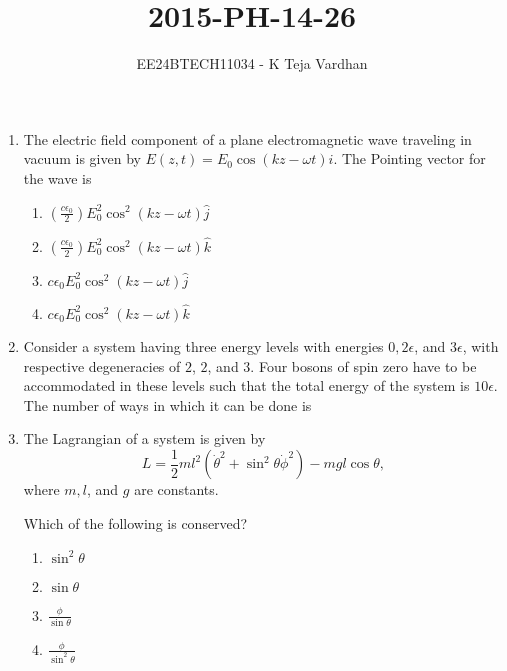 \documentclass{article}
\newcommand{\brak}[1]{\left( #1 \right)}
\begin{document}

\title{2015-PH-14-26}
\author{EE24BTECH11034 - K Teja Vardhan}
{\let\newpage\relax\maketitle}

\begin{enumerate}

 \item The electric field component of a plane electromagnetic wave traveling in vacuum is given by $E\brak{z,t} = E_0 \cos\brak{kz - \omega t}\hat{i}$. The Pointing vector for the wave is

        \begin{enumerate}
            \item $\brak{\frac{c \epsilon_0}{2}}E_0^2 \cos^2\brak{kz - \omega t} \hat{j}$
            \item $\brak{\frac{c \epsilon_0}{2}}E_0^2 \cos^2\brak{kz - \omega t} \hat{k}$
            \item $c \epsilon_0 E_0^2 \cos^2\brak{kz - \omega t} \hat{j}$
            \item $c \epsilon_0 E_0^2 \cos^2\brak{kz - \omega t} \hat{k}$
        \end{enumerate}

    \item Consider a system having three energy levels with energies $0, 2\epsilon$, and $3\epsilon$, with respective degeneracies of $2$, $2$, and $3$. Four bosons of spin zero have to be accommodated in these levels such that the total energy of the system is $10\epsilon$.  
 The number of ways in which it can be done is \underline{\hspace{2cm}}

    \item The Lagrangian of a system is given by
    $$L = \frac{1}{2}ml^2\brak{\dot{\theta}^2 + \sin^2\theta \dot{\phi}^2} - mgl\cos\theta,$$
    where $m, l$, and $g$ are constants.

    Which of the following is conserved?

    \begin{enumerate}
        \item $\sin^2\theta$
        \item $\sin\theta$
        \item $\frac{\phi}{\sin\theta}$
        \item $\frac{\phi}{\sin^2\theta}$
    \end{enumerate}


\end{enumerate}
\end{document}
